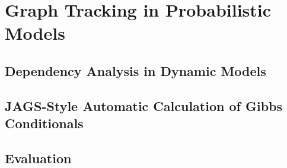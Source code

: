 \chapter{Graph Tracking in Probabilistic Models}
\label{cha:graph-track-prob}

\section{Dependency Analysis in Dynamic Models}
\label{sec:depend-analys-dynam}

\section{JAGS-Style Automatic Calculation of Gibbs Conditionals}
\label{sec:jags-style-automatic}

\section{Evaluation}
\label{sec:autogibbs-eval}

